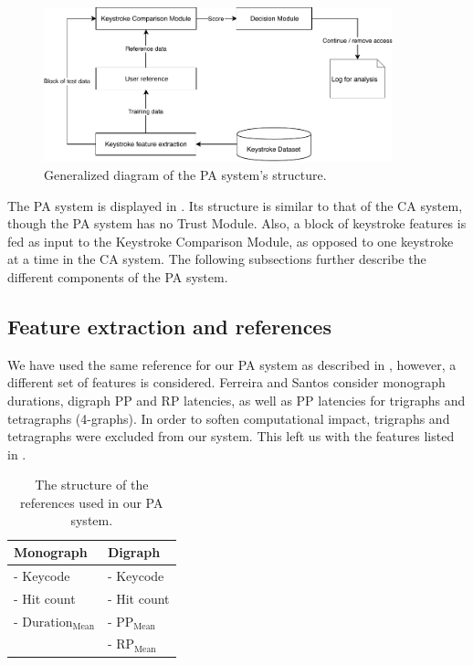 \begin{figure}[h]
    \centering
    \includegraphics[width=0.9\textwidth]{figures/PA-diagram.pdf}
    \caption{Generalized diagram of the PA system's structure.}
    \label{fig:PA-diagram}
\end{figure}

The PA system is displayed in .
Its structure is similar to that of the CA system, though the PA system has no Trust Module. 
Also, a block of keystroke features is fed as input to the Keystroke Comparison Module, as opposed to one keystroke at a time in the CA system.
The following subsections further describe the different components of the PA system.

\subsection{Feature extraction and references}
We have used the same reference for our PA system as described in , however, a different set of features is considered.
Ferreira and Santos \cite{superResults} consider monograph durations, digraph PP and RP latencies, as well as PP latencies for trigraphs and tetragraphs (4-graphs).
In order to soften computational impact, trigraphs and tetragraphs were excluded from our system.
This left us with the features listed in .

\begin{table}[h]
\centering
\begin{tabular}{|l|l|}
\hline
Monograph & Digraph\\ \hline
- Keycode & - Keycode\\
- Hit count & - Hit count\\
- $\text{Duration}_{\text{Mean}} $& - $\text{PP}_{\text{Mean}}$\\
& - $\text{RP}_{\text{Mean}}$ \\
\hline
\end{tabular}

\caption{The structure of the references used in our PA system.}
\label{tab:PA-reference-structure}
\end{table}

